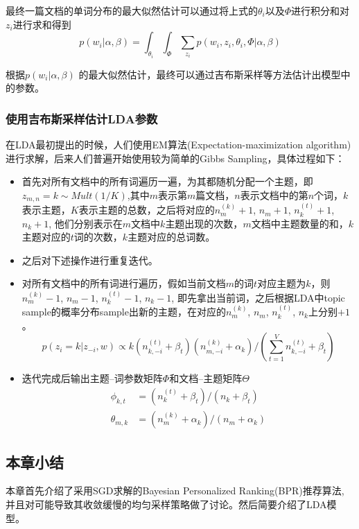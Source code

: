 最终一篇文档的单词分布的最大似然估计可以通过将上式的$\theta_i$以及$\Phi$进行积分和对$z_i$进行求和得到
\begin{equation}
p(w_i | \alpha, \beta)  = \int_{\theta_i}\int_{\Phi }\sum_{z_i}p(w_i, z_i, \theta_i, \Phi | \alpha, \beta) 
\end{equation}


根据$p(w_i | \alpha, \beta)$ 的最大似然估计，最终可以通过吉布斯采样等方法估计出模型中的参数。


\subsubsection{使用吉布斯采样估计LDA参数}
在LDA最初提出的时候，人们使用EM算法(Expectation-maximization algorithm)进行求解，后来人们普遍开始使用较为简单的Gibbs Sampling，具体过程如下：
\begin{itemize}
	\item 首先对所有文档中的所有词遍历一遍，为其都随机分配一个主题，即$z_{m,n}=k\sim Mult(1/K)$,其中$m$表示第$m$篇文档，$n$表示文档中的第$n$个词，$k$表示主题，$K$表示主题的总数，之后将对应的$n^{\left(k\right)}_m+1$, $n_m+1$, $n^{\left(t\right)}_k+1$, $n_k+1$, 他们分别表示在$m$文档中$k$主题出现的次数，$m$文档中主题数量的和，$k$主题对应的$t$词的次数，$k$主题对应的总词数。
	\item 之后对下述操作进行重复迭代。
	\item 对所有文档中的所有词进行遍历，假如当前文档$m$的词$t$对应主题为$k$，则$n^{\left(k\right)}_m-1$, $n_m-1$, $n^{\left(t\right)}_k-1$, $n_k-1$, 即先拿出当前词，之后根据LDA中topic sample的概率分布sample出新的主题，在对应的$n^{\left(k\right)}_m$, $n_m$, $n^{\left(t\right)}_k$, $n_k$上分别$+1$。
	\begin{equation}
	p(z_i=k|z_{-i},w) \propto k(n^{(t)}_{k,-i}+\beta_t)(n_{m,-i}^{(k)}+\alpha_k)/(\sum_{t=1}^{V}n_{k,-i}^{(t)}+\beta_t)
	\end{equation}
	\item 迭代完成后输出主题--词参数矩阵$\Phi$和文档--主题矩阵$\Theta$
	\begin{align}
	\phi_{k,t}   &=(n_k^{(t)}+\beta_t)/(n_k+\beta_t)  \\
	\theta_{m,k} &=(n_m^{(k)}+\alpha_k)/(n_m+\alpha_k)
	\end{align}
\end{itemize}









\subsection{本章小结}
本章首先介绍了采用SGD求解的Bayesian Personalized Ranking(BPR)推荐算法, 并且对可能导致其收敛缓慢的均匀采样策略做了讨论。然后简要介绍了LDA模型。